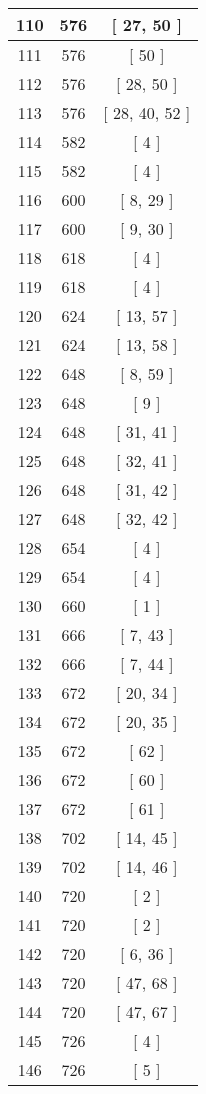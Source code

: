 \begin{center}
\begin{longtable}[H]{|| c c c ||}
\hline
110 & 576 & [ 27, 50 ] \\ 
\hline
111 & 576 & [ 50 ] \\ 
\hline
112 & 576 & [ 28, 50 ] \\ 
\hline
113 & 576 & [ 28, 40, 52 ] \\ 
\hline
114 & 582 & [ 4 ] \\ 
\hline
115 & 582 & [ 4 ] \\ 
\hline
116 & 600 & [ 8, 29 ] \\ 
\hline
117 & 600 & [ 9, 30 ] \\ 
\hline
118 & 618 & [ 4 ] \\ 
\hline
119 & 618 & [ 4 ] \\ 
\hline
120 & 624 & [ 13, 57 ] \\ 
\hline
121 & 624 & [ 13, 58 ] \\ 
\hline
122 & 648 & [ 8, 59 ] \\ 
\hline
123 & 648 & [ 9 ] \\ 
\hline
124 & 648 & [ 31, 41 ] \\ 
\hline
125 & 648 & [ 32, 41 ] \\ 
\hline
126 & 648 & [ 31, 42 ] \\ 
\hline
127 & 648 & [ 32, 42 ] \\ 
\hline
128 & 654 & [ 4 ] \\ 
\hline
129 & 654 & [ 4 ] \\ 
\hline
130 & 660 & [ 1 ] \\ 
\hline
131 & 666 & [ 7, 43 ] \\ 
\hline
132 & 666 & [ 7, 44 ] \\ 
\hline
133 & 672 & [ 20, 34 ] \\ 
\hline
134 & 672 & [ 20, 35 ] \\ 
\hline
135 & 672 & [ 62 ] \\ 
\hline
136 & 672 & [ 60 ] \\ 
\hline
137 & 672 & [ 61 ] \\ 
\hline
138 & 702 & [ 14, 45 ] \\ 
\hline
139 & 702 & [ 14, 46 ] \\ 
\hline
140 & 720 & [ 2 ] \\ 
\hline
141 & 720 & [ 2 ] \\ 
\hline
142 & 720 & [ 6, 36 ] \\ 
\hline
143 & 720 & [ 47, 68 ] \\ 
\hline
144 & 720 & [ 47, 67 ] \\ 
\hline
145 & 726 & [ 4 ] \\ 
\hline
146 & 726 & [ 5 ] \\ 

\end{longtable}
\end{center}

